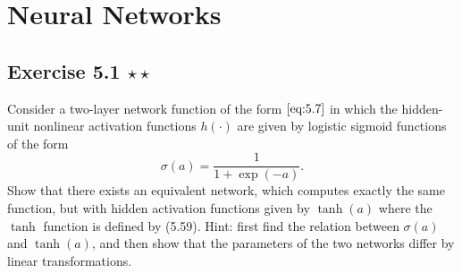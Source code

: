 \chapter{Neural Networks}

\section*{Exercise 5.1 $\star \star$}
Consider a two-layer network function of the form $\eqref{eq:5.7}$ 
in which the hidden-unit nonlinear activation functions $h(\cdot)$ 
are given by logistic sigmoid functions of the form
\begin{equation}\label{eq:5.191}\tag{5.191}
    \sigma(a) = \frac{1}{1 + \exp(-a)}.
\end{equation}
Show that there exists an equivalent network, which computes 
exactly the same function, but with hidden activation functions
given by $\tanh(a)$ where the $\tanh$ function is defined by
(5.59). Hint: first find the relation between $\sigma(a)$ 
and $\tanh(a)$, and then show that the parameters of the two
networks differ by linear transformations.

\vspace{1em}

